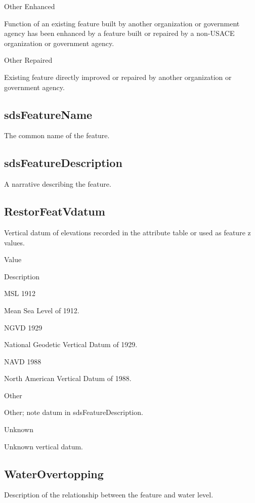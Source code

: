 \documentclass[
  letterpaper,
  DIV=11,
  numbers=noendperiod]{scrreprt}
\begin{document}
Other Enhanced

Function of an existing feature built by another organization or
government agency has been enhanced by a feature built or repaired by a
non-USACE organization or government agency.

Other Repaired

Existing feature directly improved or repaired by another organization
or government agency.

\subsection{sdsFeatureName}\label{sdsfeaturename-13}

The common name of the feature.

\subsection{sdsFeatureDescription}\label{sdsfeaturedescription-13}

A narrative describing the feature.

\subsection{RestorFeatVdatum}\label{restorfeatvdatum-13}

Vertical datum of elevations recorded in the attribute table or used as
feature z values.

Value

Description

MSL 1912

Mean Sea Level of 1912.

NGVD 1929

National Geodetic Vertical Datum of 1929.

NAVD 1988

North American Vertical Datum of 1988.

Other

Other; note datum in sdsFeatureDescription.

Unknown

Unknown vertical datum.

\subsection{WaterOvertopping}\label{waterovertopping-2}

Description of the relationship between the feature and water level.
\end{document}
